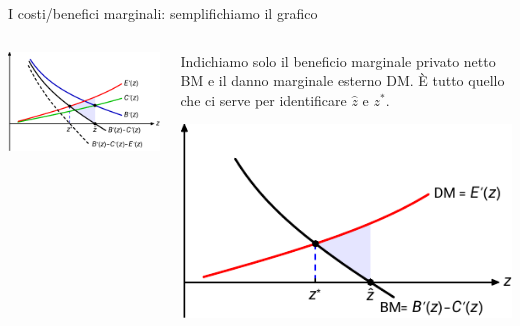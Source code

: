 \documentclass[aspectratio=64,11pt]{beamer}
\begin{document}
\begin{frame}{I costi/benefici marginali: semplifichiamo il grafico}
\begin{columns}
\begin{column}[b]{.5\columnwidth}
\begin{center}
\includegraphics[width=\textwidth]{./figure/esternalita-2-color.pdf}
\end{center}

\vfill

\hfill
{}
\end{column}

\begin{column}[b]{.5\columnwidth}
Indichiamo solo il beneficio marginale privato netto BM e il danno marginale esterno DM. È tutto quello che ci serve per identificare $\hat{z}$ e $z^*$.
\vfill

\begin{center}
\includegraphics[width=\textwidth]{./figure/esternalita-3-color.pdf}
\end{center}
\end{column}
\end{columns}
\end{frame}
\end{document}
